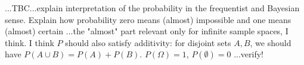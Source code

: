 ...TBC...explain interpretation of the probability in the frequentist and Bayesian sense. Explain how probability zero means (almost) impossible and one means (almost) certain ...the "almost" part relevant only for infinite sample spaces, I think. I think $P$ should also satisfy additivity: for disjoint sets $A,B$, we should have $P(A \cup B) = P(A) + P(B)$. $P(\Omega) = 1$, $P(\emptyset) = 0$ ...verify!









\begin{comment}

Probability is just...really weird
https://www.youtube.com/watch?v=zczGnnM05TQ

\end{comment}

